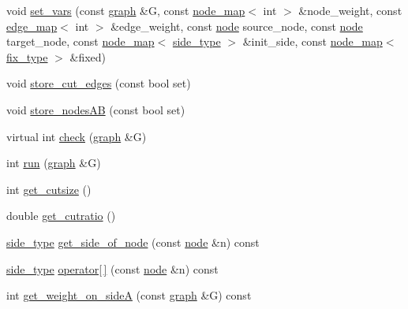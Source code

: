 \begin{DoxyCompactItemize}
\item 
void \mbox{\hyperlink{classratio__cut__partition_a0ed59d80c7e15d2865d6aa4657ae3f78}{set\+\_\+vars}} (const \mbox{\hyperlink{classgraph}{graph}} \&G, const \mbox{\hyperlink{classnode__map}{node\+\_\+map}}$<$ int $>$ \&node\+\_\+weight, const \mbox{\hyperlink{classedge__map}{edge\+\_\+map}}$<$ int $>$ \&edge\+\_\+weight, const \mbox{\hyperlink{classnode}{node}} source\+\_\+node, const \mbox{\hyperlink{classnode}{node}} target\+\_\+node, const \mbox{\hyperlink{classnode__map}{node\+\_\+map}}$<$ \mbox{\hyperlink{classratio__cut__partition_ace53442bd0c1e21fbf00858ec6f6b456}{side\+\_\+type}} $>$ \&init\+\_\+side, const \mbox{\hyperlink{classnode__map}{node\+\_\+map}}$<$ \mbox{\hyperlink{classratio__cut__partition_a558dda40abda8ab03edb4605dbb81e36}{fix\+\_\+type}} $>$ \&fixed)
\item 
void \mbox{\hyperlink{classratio__cut__partition_af5a76fa0ecaf2c75792cc2c1574994c7}{store\+\_\+cut\+\_\+edges}} (const bool set)
\item 
void \mbox{\hyperlink{classratio__cut__partition_af0efdeab02cb235df47e2339c196051f}{store\+\_\+nodes\+AB}} (const bool set)
\item 
virtual int \mbox{\hyperlink{classratio__cut__partition_a469c613c69db19cb63e492075346fea2}{check}} (\mbox{\hyperlink{classgraph}{graph}} \&G)
\item 
int \mbox{\hyperlink{classratio__cut__partition_a4ab180ca4cf57c811e3478c3de4c4dc3}{run}} (\mbox{\hyperlink{classgraph}{graph}} \&G)
\item 
int \mbox{\hyperlink{classratio__cut__partition_a4fc9beab107546850974ffd5a47c1e7f}{get\+\_\+cutsize}} ()
\item 
double \mbox{\hyperlink{classratio__cut__partition_a9a61b2be36953d57e36fbb511cf1aa96}{get\+\_\+cutratio}} ()
\item 
\mbox{\hyperlink{classratio__cut__partition_ace53442bd0c1e21fbf00858ec6f6b456}{side\+\_\+type}} \mbox{\hyperlink{classratio__cut__partition_a3b0a7dcc26c9ca25016abf2cebf250fe}{get\+\_\+side\+\_\+of\+\_\+node}} (const \mbox{\hyperlink{classnode}{node}} \&n) const
\item 
\mbox{\hyperlink{classratio__cut__partition_ace53442bd0c1e21fbf00858ec6f6b456}{side\+\_\+type}} \mbox{\hyperlink{classratio__cut__partition_a47358935eb416c38969b66fbf3f095b5}{operator\mbox{[}$\,$\mbox{]}}} (const \mbox{\hyperlink{classnode}{node}} \&n) const
\item 
int \mbox{\hyperlink{classratio__cut__partition_af68528cd0b199718e6b2f5fe8182e779}{get\+\_\+weight\+\_\+on\+\_\+sideA}} (const \mbox{\hyperlink{classgraph}{graph}} \&G) const

\end{DoxyCompactItemize}
